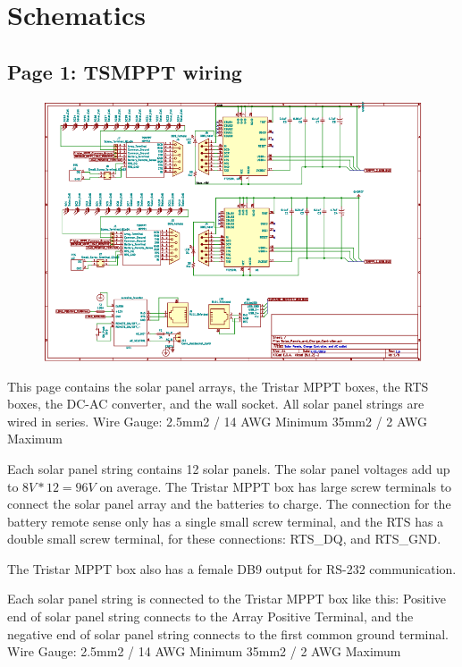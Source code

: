 \section{Schematics}

\subsection{Page 1: TSMPPT wiring}

\begin{figure}
	\includegraphics{./graphics/schematic/sch_page_1.png}
\end{figure}
This page contains the solar panel arrays, the Tristar MPPT boxes, the RTS boxes, the DC-AC converter, and the wall socket.
All solar panel strings are wired in series.
\newline
Wire Gauge: 
2.5mm2 / 14 AWG Minimum
35mm2 / 2 AWG Maximum 

Each solar panel string contains 12 solar panels. The solar panel voltages add up to $8V*12 = 96V$ on average.
The Tristar MPPT box has large screw terminals to connect the solar panel array and the batteries to charge. The connection for the battery remote sense only has a single small screw terminal, and the RTS has a double small screw terminal, for these connections: RTS\_DQ, and RTS\_GND.

The Tristar MPPT box also has a female DB9 output for RS-232 communication.

Each solar panel string is connected to the Tristar MPPT box like this: 
Positive end of solar panel string connects to the Array Positive Terminal, and the negative end of solar panel string connects to the first common ground terminal.
\newline
Wire Gauge: 
2.5mm2 / 14 AWG Minimum
35mm2 / 2 AWG Maximum 

